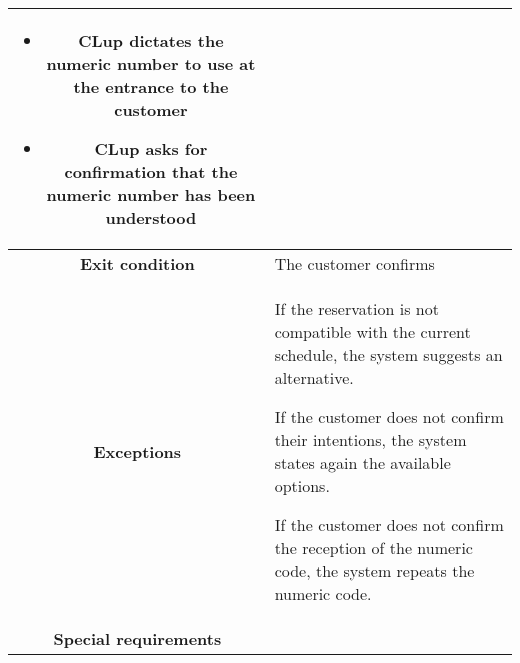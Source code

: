 \documentclass[../../main.tex]{subfiles}
\begin{document}
\begin{table}[H]
\begin{tabular}{c m{}}
\begin{itemize}
                                      \item CLup dictates the numeric number to use at the entrance to the customer
                                      \item CLup asks for confirmation that the numeric number has been understood
                                    \end{itemize}\\ \hline
          \textbf{Exit condition} & The customer confirms \\ \hline
          \textbf{Exceptions} & If the reservation is not compatible with the current schedule, the system suggests an alternative.
          
                                If the customer does not confirm their intentions, the system states again the available options.
                                
                                If the customer does not confirm the reception of the numeric code, the system repeats the numeric code.\\ \hline
          \textbf{Special requirements} &\\ \hline
          \end{tabular}
      \end{table}
\end{document}
